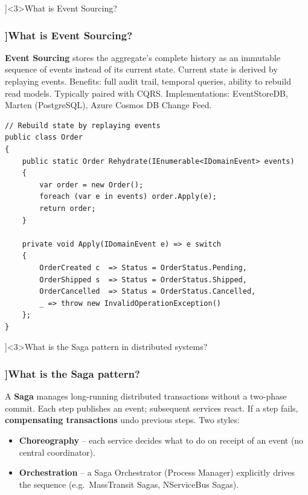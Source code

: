 \QuestionSlide[\CategoryBadge[DDDColor!20]{DDD \& CQRS}]<3>{What is Event Sourcing?}

\begin{frame}[fragile]
  \frametitle{\AnswerTitle[\CategoryBadge[DDDColor!20]{DDD \& CQRS}]{What is Event Sourcing?}}

  {\footnotesize
  \textbf{Event Sourcing} stores the aggregate's complete history as an immutable sequence of events instead of its current state. Current state is derived by replaying events. Benefits: full audit trail, temporal queries, ability to rebuild read models. Typically paired with CQRS. Implementations: EventStoreDB, Marten (PostgreSQL), Azure Cosmos DB Change Feed.
  }

  \begin{verbatim}
// Rebuild state by replaying events
public class Order
{
    public static Order Rehydrate(IEnumerable<IDomainEvent> events)
    {
        var order = new Order();
        foreach (var e in events) order.Apply(e);
        return order;
    }

    private void Apply(IDomainEvent e) => e switch
    {
        OrderCreated c  => Status = OrderStatus.Pending,
        OrderShipped s  => Status = OrderStatus.Shipped,
        OrderCancelled  => Status = OrderStatus.Cancelled,
        _ => throw new InvalidOperationException()
    };
}
  \end{verbatim}
\end{frame}

\QuestionSlide[\CategoryBadge[DDDColor!20]{DDD \& CQRS}]<3>{What is the Saga pattern in distributed systems?}

\begin{frame}[fragile]
  \frametitle{\AnswerTitle[\CategoryBadge[DDDColor!20]{DDD \& CQRS}]{What is the Saga pattern?}}

  {\footnotesize
  A \textbf{Saga} manages long-running distributed transactions without a two-phase commit. Each step publishes an event; subsequent services react. If a step fails, \textbf{compensating transactions} undo previous steps. Two styles:
  \begin{itemize}
    \item \textbf{Choreography} – each service decides what to do on receipt of an event (no central coordinator).
    \item \textbf{Orchestration} – a Saga Orchestrator (Process Manager) explicitly drives the sequence (e.g.\ MassTransit Sagas, NServiceBus Sagas).
  \end{itemize}
  }
\end{frame}
